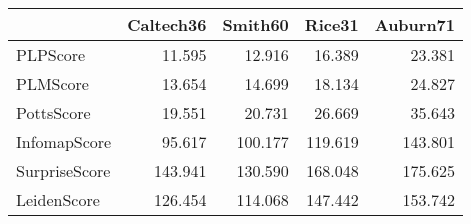 \begin{tabular}{lrrrr}
\toprule
{} & Caltech36 & Smith60 &  Rice31 & Auburn71 \\
\midrule
PLPScore      &    11.595 &  12.916 &  16.389 &   23.381 \\
PLMScore      &    13.654 &  14.699 &  18.134 &   24.827 \\
PottsScore    &    19.551 &  20.731 &  26.669 &   35.643 \\
InfomapScore  &    95.617 & 100.177 & 119.619 &  143.801 \\
SurpriseScore &   143.941 & 130.590 & 168.048 &  175.625 \\
LeidenScore   &   126.454 & 114.068 & 147.442 &  153.742 \\
\bottomrule
\end{tabular}
